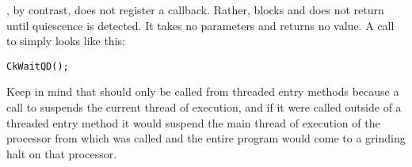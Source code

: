 , by contrast, does not register a callback.  Rather,
 blocks and does not return until quiescence is
detected.  It takes no parameters and returns no value.  A call to
 simply looks like this: 

\begin{alltt}
  CkWaitQD();
\end{alltt}

Keep in mind that  should only be called from threaded
entry methods because a call to  suspends the
current thread of execution, and if it were called outside of a threaded entry
method it would suspend the main thread of execution of the processor from
which  was called and the entire program would come to a grinding
halt on that processor.
